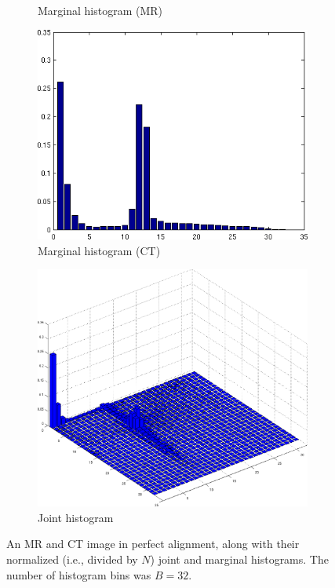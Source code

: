 \documentclass[10pt,twoside]{book}
\begin{document}
\begin{figure}
\begin{subfigure}{0.4\textwidth}
     \caption{Marginal histogram (MR)}
     \label{fig:registration_MR_marginal}
  \end{subfigure}
  \hfill
  \begin{subfigure}{0.4\textwidth}
     \centering
     \includegraphics[width=\textwidth]{snapshot_plots__doInterModality_1__doMutualInformation_0__xOffset_0__marginal2}
     \caption{Marginal histogram (CT)}
     \label{fig:registration_CT_marginal}
  \end{subfigure}
  \begin{subfigure}{0.8\textwidth}
     \centering
     \includegraphics[width=\textwidth]{snapshot_plots__doInterModality_1__doMutualInformation_1__xOffset_0__pdf}
     \caption{Joint histogram}
     \label{fig:registration_joint}
  \end{subfigure}
  \caption{An MR and CT image in perfect alignment, along with their normalized (i.e., divided by $N$) joint and marginal histograms. The number of histogram bins was $B=32$.}
  \label{fig:registration_histograms}
\end{figure}
\end{document}
